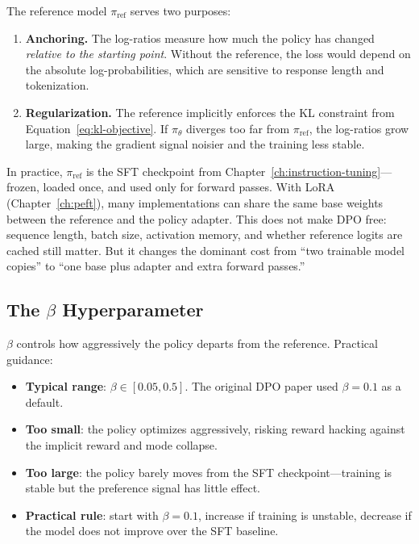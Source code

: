 The reference model $\pi_{\text{ref}}$ serves two purposes:

\begin{enumerate}[nosep]
  \item \textbf{Anchoring.} The log-ratios measure how much the policy has changed \emph{relative to the starting point}. Without the reference, the loss would depend on the absolute log-probabilities, which are sensitive to response length and tokenization.
  \item \textbf{Regularization.} The reference implicitly enforces the KL constraint from Equation~\ref{eq:kl-objective}. If $\pi_\theta$ diverges too far from $\pi_{\text{ref}}$, the log-ratios grow large, making the gradient signal noisier and the training less stable.
\end{enumerate}

In practice, $\pi_{\text{ref}}$ is the SFT checkpoint from Chapter~\ref{ch:instruction-tuning}---frozen, loaded once, and used only for forward passes. With LoRA (Chapter~\ref{ch:peft}), many implementations can share the same base weights between the reference and the policy adapter. This does not make DPO free: sequence length, batch size, activation memory, and whether reference logits are cached still matter. But it changes the dominant cost from ``two trainable model copies'' to ``one base plus adapter and extra forward passes.''

\subsection{\texorpdfstring{The $\beta$ Hyperparameter}{The beta Hyperparameter}}

$\beta$ controls how aggressively the policy departs from the reference. Practical guidance:

\begin{itemize}[nosep]
  \item \textbf{Typical range}: $\beta \in [0.05, 0.5]$. The original DPO paper used $\beta = 0.1$ as a default.
  \item \textbf{Too small}: the policy optimizes aggressively, risking reward hacking against the implicit reward and mode collapse.
  \item \textbf{Too large}: the policy barely moves from the SFT checkpoint---training is stable but the preference signal has little effect.
  \item \textbf{Practical rule}: start with $\beta = 0.1$, increase if training is unstable, decrease if the model does not improve over the SFT baseline.
\end{itemize}


